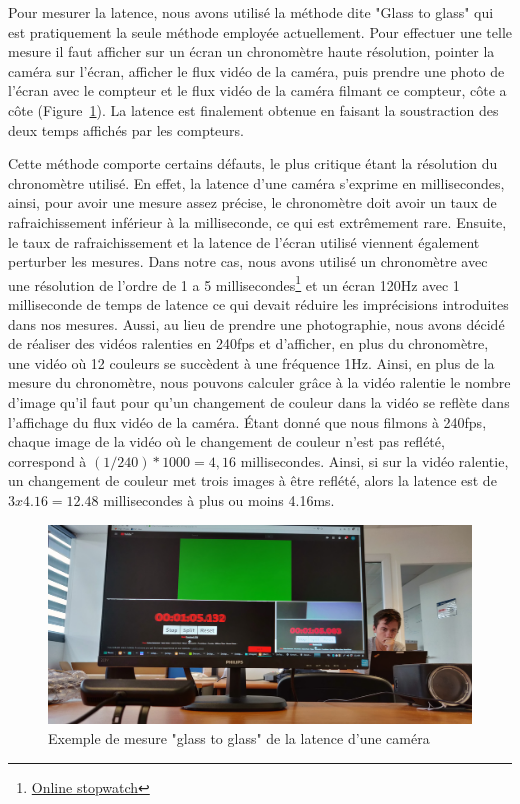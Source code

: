 Pour mesurer la latence, nous avons utilisé la méthode dite "Glass to glass" qui est pratiquement la seule méthode employée actuellement. Pour effectuer une telle mesure il faut afficher sur un écran un chronomètre haute résolution, pointer la caméra sur l'écran, afficher le flux vidéo de la caméra, puis prendre une photo de l'écran avec le compteur et le flux vidéo de la caméra filmant ce compteur, côte a côte (Figure~\ref{fig:latency:glasstoglass}). La latence est finalement obtenue en faisant la soustraction des deux temps affichés par les compteurs. 

Cette méthode comporte certains défauts, le plus critique étant la résolution du chronomètre utilisé. En effet, la latence d'une caméra s'exprime en millisecondes, ainsi, pour avoir une mesure assez précise, le chronomètre doit avoir un taux de rafraichissement inférieur à la milliseconde, ce qui est extrêmement rare. Ensuite, le taux de rafraichissement et la latence de l'écran utilisé viennent également perturber les mesures. Dans notre cas, nous avons utilisé un chronomètre avec une résolution de l'ordre de 1 a 5 millisecondes\footnote{\href{https://stopwatch.onlineclock.net/}{Online stopwatch}} et un écran 120Hz avec 1 milliseconde de temps de latence ce qui devait réduire les imprécisions introduites dans nos mesures. Aussi, au lieu de prendre une photographie, nous avons décidé de réaliser des vidéos ralenties en 240fps et d'afficher, en plus du chronomètre, une vidéo où 12 couleurs se succèdent à une fréquence 1Hz. Ainsi, en plus de la mesure du chronomètre, nous pouvons calculer grâce à la vidéo ralentie le nombre d'image qu'il faut pour qu'un changement de couleur dans la vidéo se reflète dans l'affichage du flux vidéo de la caméra. Étant donné que nous filmons à 240fps, chaque image de la vidéo où le changement de couleur n'est pas reflété, correspond à $(1/240) * 1000 = 4,16$ millisecondes. Ainsi, si sur la vidéo ralentie, un changement de couleur met trois images à être reflété, alors la latence est de $3 x 4.16 = 12.48$ millisecondes à plus ou moins 4.16ms.

\begin{figure}[H]
\centering
\includegraphics[width=\linewidth]{images/glasstoglass}
\caption{Exemple de mesure "glass to glass" de la latence d'une caméra}
\label{fig:latency:glasstoglass}
\end{figure}

